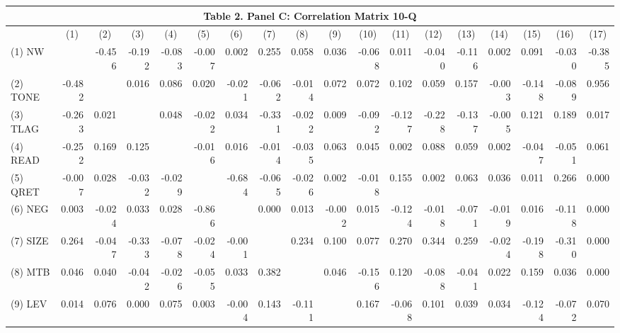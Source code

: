 \begin{table}[htbp] \label{T2PC}
  \centering
    \begin{tabular}{lrrrrrrrrrrrrrrrrr}
    \multicolumn{18}{c}{\textbf{Table 2. Panel C: Correlation Matrix 10-Q}} \\
    \midrule
    \midrule
      & \multicolumn{1}{c}{(1)} & \multicolumn{1}{c}{(2)} & \multicolumn{1}{c}{(3)} & \multicolumn{1}{c}{(4)} & \multicolumn{1}{c}{(5)} & \multicolumn{1}{c}{(6)} & \multicolumn{1}{c}{(7)} & \multicolumn{1}{c}{(8)} & \multicolumn{1}{c}{(9)} & \multicolumn{1}{c}{(10)} & \multicolumn{1}{c}{(11)} & \multicolumn{1}{c}{(12)} & \multicolumn{1}{c}{(13)} & \multicolumn{1}{c}{(14)} & \multicolumn{1}{c}{(15)} & \multicolumn{1}{c}{(16)} & \multicolumn{1}{c}{(17)} \\
    \midrule
    (1) NW &  & -0.456 & -0.192 & -0.083 & -0.007 & 0.002 & 0.255 & 0.058 & 0.036 & -0.068 & 0.011 & -0.040 & -0.116 & 0.002 & 0.091 & -0.030 & -0.385 \\
    (2) TONE & -0.482 &  & 0.016 & 0.086 & 0.020 & -0.021 & -0.062 & -0.014 & 0.072 & 0.072 & 0.102 & 0.059 & 0.157 & -0.003 & -0.148 & -0.089 & 0.956 \\
    (3) TLAG & -0.263 & 0.021 &  & 0.048 & -0.022 & 0.034 & -0.331 & -0.022 & 0.009 & -0.092 & -0.127 & -0.228 & -0.137 & -0.005 & 0.121 & 0.189 & 0.017 \\
    (4) READ & -0.252 & 0.169 & 0.125 &  & -0.016 & 0.016 & -0.014 & -0.035 & 0.063 & 0.045 & 0.002 & 0.088 & 0.059 & 0.002 & -0.047 & -0.051 & 0.061 \\
    (5) QRET & -0.007 & 0.028 & -0.032 & -0.029 &  & -0.684 & -0.065 & -0.026 & 0.002 & -0.018 & 0.155 & 0.002 & 0.063 & 0.036 & 0.011 & 0.266 & 0.000 \\
    (6) NEG & 0.003 & -0.024 & 0.033 & 0.028 & -0.866 &  & 0.000 & 0.013 & -0.002 & 0.015 & -0.124 & -0.018 & -0.071 & -0.019 & 0.016 & -0.118 & 0.000 \\
    (7) SIZE & 0.264 & -0.047 & -0.333 & -0.078 & -0.024 & -0.001 &  & 0.234 & 0.100 & 0.077 & 0.270 & 0.344 & 0.259 & -0.024 & -0.198 & -0.310 & 0.000 \\
    (8) MTB & 0.046 & 0.040 & -0.042 & -0.026 & -0.055 & 0.033 & 0.382 &  & 0.046 & -0.156 & 0.120 & -0.088 & -0.041 & 0.022 & 0.159 & 0.036 & 0.000 \\
    (9) LEV & 0.014 & 0.076 & 0.000 & 0.075 & 0.003 & -0.004 & 0.143 & -0.111 &  & 0.167 & -0.068 & 0.101 & 0.039 & 0.034 & -0.124 & -0.072 & 0.070 \\

\end{tabular}
\end{table}

